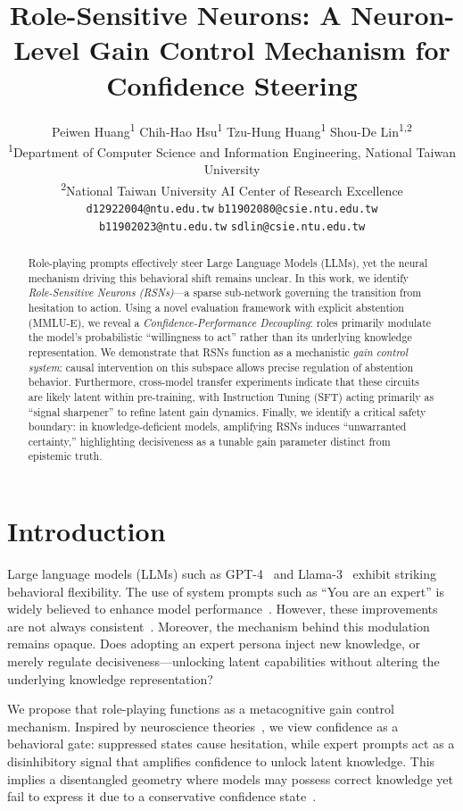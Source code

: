 \documentclass{article}
\title{Role-Sensitive Neurons: A Neuron-Level Gain Control Mechanism for Confidence Steering}
\author{
  Peiwen Huang\textsuperscript{1} \quad Chih-Hao Hsu\textsuperscript{1} \quad Tzu-Hung Huang\textsuperscript{1} \quad Shou-De Lin\textsuperscript{1,2} \\
  \textsuperscript{1}Department of Computer Science and Information Engineering, National Taiwan University \\
  \textsuperscript{2}National Taiwan University AI Center of Research Excellence \\
  \texttt{d12922004@ntu.edu.tw} \quad \texttt{b11902080@csie.ntu.edu.tw} \\
  \texttt{b11902023@ntu.edu.tw} \quad \texttt{sdlin@csie.ntu.edu.tw}
}
\begin{document}
\maketitle

\begin{abstract}
Role-playing prompts effectively steer Large Language Models (LLMs), yet the neural mechanism driving this behavioral shift remains unclear. In this work, we identify \emph{Role-Sensitive Neurons (RSNs)}—a sparse sub-network governing the transition from hesitation to action. Using a novel evaluation framework with explicit abstention (MMLU-E), we reveal a \emph{Confidence-Performance Decoupling}: roles primarily modulate the model's probabilistic ``willingness to act'' rather than its underlying knowledge representation. We demonstrate that RSNs function as a mechanistic \emph{gain control system}: causal intervention on this subspace allows precise regulation of abstention behavior. Furthermore, cross-model transfer experiments indicate that these circuits are likely latent within pre-training, with Instruction Tuning (SFT) acting primarily as ``signal sharpener'' to refine latent gain dynamics. Finally, we identify a critical safety boundary: in knowledge-deficient models, amplifying RSNs induces ``unwarranted certainty,'' highlighting decisiveness as a tunable gain parameter distinct from epistemic truth.
\end{abstract}

\section{Introduction}
Large language models (LLMs) such as GPT-4~\cite{gpt-4} and Llama-3~\cite{Llama3} exhibit striking behavioral flexibility. The use of system prompts such as ``You are an expert'' is widely believed to enhance model performance~\cite{13-naacl2024-better,15-neurips2024-incontext,16-nature2023-role,25-emnlp2024-twotales}. However, these improvements are not always consistent~\cite{14-snu2024-persona,27-nankai2024-prompttuning}. Moreover, the mechanism behind this modulation remains opaque. Does adopting an expert persona inject new knowledge, or merely regulate decisiveness—unlocking latent capabilities without altering the underlying knowledge representation?

We propose that role-playing functions as a metacognitive gain control mechanism. Inspired by neuroscience theories~\cite{paper4_dopamine,paper6_context,paper7_metacognition}, we view confidence as a behavioral gate: suppressed states cause hesitation, while expert prompts act as a disinhibitory signal that amplifies confidence to unlock latent knowledge. This implies a disentangled geometry where models may possess correct knowledge yet fail to express it due to a conservative confidence state~\cite{paper7_metacognition, paper2_neural_basis}.
\end{document}
